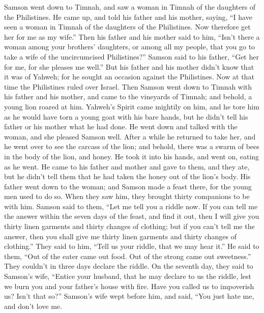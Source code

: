  Samson went down to Timnah, and saw a woman in Timnah of
the daughters of the Philistines.  He came up, and told
his father and his mother, saying, ``I have seen a woman in Timnah of
the daughters of the Philistines. Now therefore get her for me as my
wife.''  Then his father and his mother said to him,
``Isn't there a woman among your brothers' daughters, or among all my
people, that you go to take a wife of the uncircumcised Philistines?''
Samson said to his father, ``Get her for me, for she pleases me well.''
 But his father and his mother didn't know that it was of
Yahweh; for he sought an occasion against the Philistines. Now at that
time the Philistines ruled over Israel.  Then Samson went
down to Timnah with his father and his mother, and came to the vineyards
of Timnah; and behold, a young lion roared at him. 
Yahweh's Spirit came mightily on him, and he tore him as he would have
torn a young goat with his bare hands, but he didn't tell his father or
his mother what he had done.  He went down and talked with
the woman, and she pleased Samson well.  After a while he
returned to take her, and he went over to see the carcass of the lion;
and behold, there was a swarm of bees in the body of the lion, and
honey.  He took it into his hands, and went on, eating as
he went. He came to his father and mother and gave to them, and they
ate, but he didn't tell them that he had taken the honey out of the
lion's body.  His father went down to the woman; and
Samson made a feast there, for the young men used to do so.
 When they saw him, they brought thirty companions to be
with him.  Samson said to them, ``Let me tell you a
riddle now. If you can tell me the answer within the seven days of the
feast, and find it out, then I will give you thirty linen garments and
thirty changes of clothing;  but if you can't tell me the
answer, then you shall give me thirty linen garments and thirty changes
of clothing.'' They said to him, ``Tell us your riddle, that we may hear
it.''  He said to them, ``Out of the eater came out food.
Out of the strong came out sweetness.'' They couldn't in three days
declare the riddle.  On the seventh day, they said to
Samson's wife, ``Entice your husband, that he may declare to us the
riddle, lest we burn you and your father's house with fire. Have you
called us to impoverish us? Isn't that so?''  Samson's
wife wept before him, and said, ``You just hate me, and don't love me.
